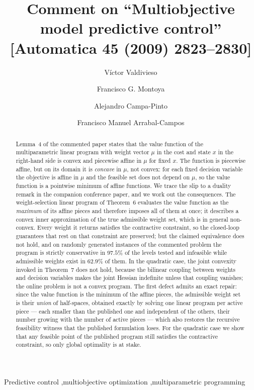 \documentclass[review]{elsarticle}
\begin{document}
\begin{frontmatter}

\title{Comment on ``Multiobjective model predictive control''
[Automatica 45 (2009) 2823--2830]}

\author[ual]{V\'ictor Valdivieso}
\author[ual]{Francisco G. Montoya}
\author[cuc]{Alejandro Campa-Pinto}
\author[ual]{Francisco Manuel Arrabal-Campos}
\address[ual]{Department of Engineering, Research Centre CIAIMBITAL,
University of Almer\'ia, 04120 Almer\'ia, Spain}
\address[cuc]{Department of Computer Science and Electronics,
Universidad de la Costa, Barranquilla 080002, Colombia}

\begin{abstract}
Lemma~4 of the commented paper states that the value function of the
multiparametric linear program with weight vector $\mu$ in the cost and state
$x$ in the right-hand side is convex and piecewise affine in $\mu$ for fixed
$x$. The function is piecewise affine, but on its domain it is \emph{concave}
in $\mu$, not convex: for each fixed decision variable the objective is affine
in $\mu$ and the feasible set does not depend on $\mu$, so the value function
is a pointwise minimum of affine functions. We trace the slip to a duality
remark in the companion conference paper, and we work out the consequences.
The weight-selection linear program of Theorem~6 evaluates the value function
as the \emph{maximum} of its affine pieces and therefore imposes all of them
at once; it describes a convex inner approximation of the true admissible
weight set, which is in general non-convex. Every weight it returns satisfies
the contractive constraint, so the closed-loop guarantees that rest on that
constraint are preserved; but the claimed equivalence does not hold, and on
randomly generated instances of the commented problem the program is strictly
conservative in $97.5\%$ of the levels tested and infeasible while admissible
weights exist in $62.9\%$ of them. In the quadratic case, the joint convexity
invoked in Theorem~7 does not hold, because the bilinear coupling between
weights and decision variables makes the joint Hessian indefinite unless that
coupling vanishes; the online problem is not a convex program. The first defect
admits an exact repair: since the value function is the minimum of the affine
pieces, the admissible weight set is their \emph{union} of half-spaces,
obtained exactly by solving one linear program per active piece --- each
smaller than the published one and independent of the others, their number
growing with the number of active pieces --- which also restores the recursive
feasibility witness that the published formulation loses. For the quadratic
case we show that any feasible point of the published program still satisfies
the contractive constraint, so only global optimality is at stake.
\end{abstract}

\begin{keyword}
Predictive control \sep multiobjective optimization \sep multiparametric
programming
\end{keyword}

\end{frontmatter}
\end{document}
